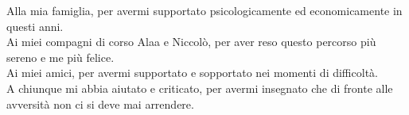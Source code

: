 \cleardoublepage
\begingroup
\let\clearpage\endgroup
\null{}
\frontmatter

\begin{flushright}
\begin{minipage}{5.3in}
\begin{flushright}
\begin{em}
Alla mia famiglia,
per avermi supportato psicologicamente ed economicamente in questi anni.
\\
Ai miei compagni di corso Alaa e Niccolò,
per aver reso questo percorso più sereno e me più felice.
\\
Ai miei amici,
per avermi supportato e sopportato nei momenti di difficoltà.
\\
A chiunque mi abbia aiutato e criticato,
per avermi insegnato che di fronte alle avversità non ci si deve mai arrendere.


\end{em}
\end{flushright}
\end{minipage}
\end{flushright}
 \null
